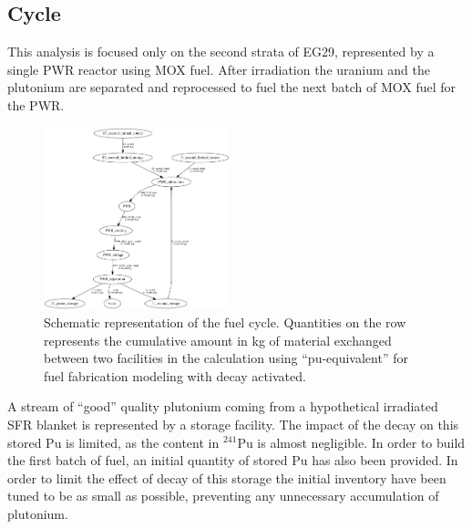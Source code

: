 \documentclass{anstrans}
\begin{document}
\subsection{Cycle}
This analysis is focused only on the second strata of EG29, represented by a single
PWR reactor using MOX fuel. After irradiation the uranium and the plutonium are
separated and reprocessed to fuel the next batch of MOX fuel for the PWR.

\begin{figure}[ht] %
  \centering
  \includegraphics[width=0.48\textwidth]{flow}
  \caption{Schematic representation of the fuel cycle. Quantities on the row
  represents the cumulative amount in kg of material exchanged between two
facilities in the calculation using ``pu-equivalent'' for fuel fabrication
modeling with decay activated.}
  \label{fig:flow}
\end{figure}

A stream of ``good'' quality plutonium coming from a hypothetical irradiated
SFR blanket is represented by a storage facility. 
The impact of the decay on this stored Pu
is limited, as the content in $^{241}$Pu is almost negligible.  In order to
build the first batch of fuel, an initial quantity of stored Pu has also been provided.
In order to limit the effect of decay of this storage the initial inventory have been
tuned to be as small as possible, preventing any unnecessary accumulation of plutonium.
\end{document}
